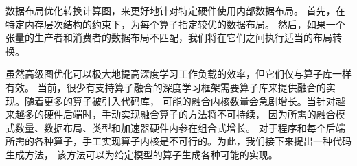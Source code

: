 数据布局优化转换计算图，来更好地针对特定硬件使用内部数据布局。
首先，在特定内存层次结构的约束下，为每个算子指定较优的数据布局。
然后，如果一个张量的生产者和消费者的数据布局不匹配，我们将在它们之间执行适当的布局转换。

虽然高级图优化可以极大地提高深度学习工作负载的效率，但它们仅与算子库一样有效。
当前，很少有支持算子融合的深度学习框架需要算子库来提供融合的实现。随着更多的算子被引入代码库，
可能的融合内核数量会急剧增长。当针对越来越多的硬件后端时，手动实现融合算子的方法将不可持续，
因为所需的融合模式数量、数据布局、类型和加速器硬件内参在组合式增长。
对于程序和每个后端所需的各种算子，手工实现算子内核是不可行的。为此，我们接下来提出一种代码生成方法，
该方法可以为给定模型的算子生成各种可能的实现。
